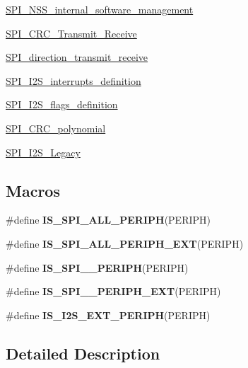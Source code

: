 \begin{DoxyCompactItemize}
\item 
\hyperlink{group___s_p_i___n_s_s__internal__software__management}{S\-P\-I\-\_\-\-N\-S\-S\-\_\-internal\-\_\-software\-\_\-management}
\item 
\hyperlink{group___s_p_i___c_r_c___transmit___receive}{S\-P\-I\-\_\-\-C\-R\-C\-\_\-\-Transmit\-\_\-\-Receive}
\item 
\hyperlink{group___s_p_i__direction__transmit__receive}{S\-P\-I\-\_\-direction\-\_\-transmit\-\_\-receive}
\item 
\hyperlink{group___s_p_i___i2_s__interrupts__definition}{S\-P\-I\-\_\-\-I2\-S\-\_\-interrupts\-\_\-definition}
\item 
\hyperlink{group___s_p_i___i2_s__flags__definition}{S\-P\-I\-\_\-\-I2\-S\-\_\-flags\-\_\-definition}
\item 
\hyperlink{group___s_p_i___c_r_c__polynomial}{S\-P\-I\-\_\-\-C\-R\-C\-\_\-polynomial}
\item 
\hyperlink{group___s_p_i___i2_s___legacy}{S\-P\-I\-\_\-\-I2\-S\-\_\-\-Legacy}
\end{DoxyCompactItemize}
\subsection*{Macros}
\begin{DoxyCompactItemize}
\item 
\#define {\bfseries I\-S\-\_\-\-S\-P\-I\-\_\-\-A\-L\-L\-\_\-\-P\-E\-R\-I\-P\-H}(P\-E\-R\-I\-P\-H)
\item 
\#define {\bfseries I\-S\-\_\-\-S\-P\-I\-\_\-\-A\-L\-L\-\_\-\-P\-E\-R\-I\-P\-H\-\_\-\-E\-X\-T}(P\-E\-R\-I\-P\-H)
\item 
\#define {\bfseries I\-S\-\_\-\-S\-P\-I\-\_\-\_\-\-P\-E\-R\-I\-P\-H}(P\-E\-R\-I\-P\-H)
\item 
\#define {\bfseries I\-S\-\_\-\-S\-P\-I\-\_\-\_\-\-P\-E\-R\-I\-P\-H\-\_\-\-E\-X\-T}(P\-E\-R\-I\-P\-H)
\item 
\#define {\bfseries I\-S\-\_\-\-I2\-S\-\_\-\-E\-X\-T\-\_\-\-P\-E\-R\-I\-P\-H}(P\-E\-R\-I\-P\-H)
\end{DoxyCompactItemize}


\subsection{Detailed Description}


